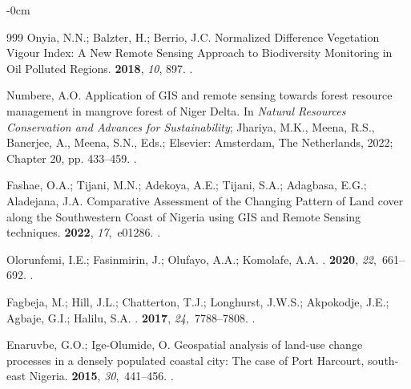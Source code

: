 \documentclass[jmse,article,accept,pdftex,moreauthors]{Definitions/mdpi}
\begin{document}
\begin{adjustwidth}{-\extralength}{0cm}
\begin{thebibliography}{999}
Onyia, N.N.; Balzter, H.; Berrio, J.C.
\newblock Normalized Difference Vegetation Vigour Index: A New Remote Sensing
  Approach to Biodiversity Monitoring in Oil Polluted Regions.
 {\bf 2018}, {\em 10}, 897.
.

Numbere, A.O.
\newblock Application of GIS and remote sensing towards forest
  resource management in mangrove forest of Niger Delta. In {\em Natural
  Resources Conservation and Advances for Sustainability}; Jhariya, M.K.,
  Meena, R.S., Banerjee, A., Meena, S.N., Eds.; Elsevier: Amsterdam, The Netherlands,  2022; Chapter 20, pp. 433--459.
. %

Fashae, O.A.; Tijani, M.N.; Adekoya, A.E.; Tijani, S.A.; Adagbasa, E.G.;
  Aladejana, J.A.
\newblock Comparative Assessment of the Changing Pattern of Land cover along
  the Southwestern Coast of Nigeria using GIS and Remote Sensing techniques.
 {\bf 2022}, {\em 17},~e01286.
.

Olorunfemi, I.E.; Fasinmirin, J.; Olufayo, A.A.; Komolafe, A.A.
.
 {\bf 2020}, {\em 22},~661--692.
.

Fagbeja, M.; Hill, J.L.; Chatterton, T.J.; Longhurst, J.W.S.; Akpokodje, J.E.;
  Agbaje, G.I.; Halilu, S.A.
.
 {\bf 2017}, {\em 24},~7788--7808.
.

Enaruvbe, G.O.; Ige-Olumide, O.
\newblock Geospatial analysis of land-use change processes in a densely
  populated coastal city: The case of Port Harcourt, south-east Nigeria.
 {\bf 2015}, {\em 30},~441--456.
.


\end{thebibliography}
\end{adjustwidth}
\end{document}
